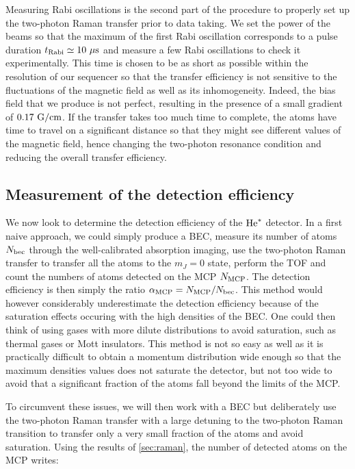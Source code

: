 Measuring Rabi oscillations is the second part of the procedure to properly set up the two-photon Raman transfer prior to data taking. We set the power of the beams so that the maximum of the first Rabi oscillation corresponds to a pulse duration $t_{\rm{Rabi}} \simeq 10 \ \mu \rm{s}$ and measure a few Rabi oscillations to check it experimentally. This time is chosen to be as short as possible within the resolution of our sequencer so that the transfer efficiency is not sensitive to the fluctuations of the magnetic field as well as its inhomogeneity. Indeed, the bias field that we produce is not perfect, resulting in the presence of a small gradient of $0.17 \ \rm{G/cm}$. If the transfer takes too much time to complete, the atoms have time to travel on a significant distance so that they might see different values of the magnetic field, hence changing the two-photon resonance condition and reducing the overall transfer efficiency.

\subsection{Measurement of the detection efficiency}

\label{sec:detection_efficiency}

We now look to determine the detection efficiency of the $\mathrm{He}^*$ detector. In a first naive approach, we could simply produce a BEC, measure its number of atoms $N_{\rm{bec}}$ through the well-calibrated absorption imaging, use the two-photon Raman transfer to transfer all the atoms to the $m_J=0$ state, perform the TOF and count the numbers of atoms detected on the MCP $N_{\rm{MCP}}$. The detection efficiency is then simply the ratio $\alpha_{\rm{MCP}}= N_{\rm{MCP}}/N_{\rm{bec}}$. This method would however considerably underestimate the detection efficiency because of the saturation effects occuring with the high densities of the BEC. One could then think of using gases with more dilute distributions to avoid saturation, such as thermal gases or Mott insulators. This method is not so easy as well as it is practically difficult to obtain a momentum distribution wide enough so that the maximum densities values does not saturate the detector, but not too wide to avoid that a significant fraction of the atoms fall beyond the limits of the MCP.

To circumvent these issues, we will then work with a BEC but deliberately use the two-photon Raman transfer with a large detuning to the two-photon Raman transition to transfer only a very small fraction of the atoms and avoid saturation. Using the results of \ref{sec:raman}, the number of detected atoms on the MCP writes:

